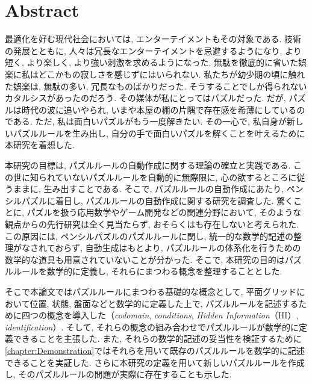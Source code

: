 \chapter*{{\rm \bf Abstract}}\label{chapter:Abstract}
最適化を好む現代社会においては, エンターテイメントもその対象である. 技術の発展とともに, 人々は冗長なエンターテイメントを忌避するようになり, より短く, より楽しく, より強い刺激を求めるようになった. 無駄を徹底的に省いた娯楽に私はどこかもの寂しさを感じずにはいられない. 私たちが幼少期の頃に触れた娯楽は, 無駄の多い, 冗長なものばかりだった. そうすることでしか得られないカタルシスがあったのだろう. その媒体が私にとってはパズルだった. だが, パズルは時代の波に追いやられ, いまや本屋の棚の片隅で存在感を希薄にしているのである. ただ, 私は面白いパズルがもう一度解きたい. その一心で, 私自身が新しいパズルルールを生み出し, 自分の手で面白いパズルを解くことを叶えるために本研究を着想した.


本研究の目標は, パズルルールの自動作成に関する理論の確立と実践である. この世に知られていないパズルルールを自動的に無際限に, 心の欲するところに従うままに, 生み出すことである. そこで, パズルルールの自動作成にあたり, ペンシルパズルに着目し, パズルルールの自動作成に関する研究を調査した. 驚くことに, パズルを扱う応用数学やゲーム開発などの関連分野において, そのような観点からの先行研究は全く見当たらず, おそらくはも存在しないと考えられた. この原因には, ペンシルパズルのパズルルールに関し, 統一的な数学的記述の整理がなされておらず, 自動生成はもとより, パズルルールの体系化を行うための数学的な道具も用意されていないことが分かった. そこで, 本研究の目的はパズルルールを数学的に定義し, それらにまつわる概念を整理することとした.

そこで本論文ではパズルルールにまつわる基礎的な概念として, 平面グリッドにおいて位置, 状態, 盤面などと数学的に定義した上で, パズルルールを記述するために四つの概念を導入した（\textit{codomain}, \textit{conditions}, \textit{Hidden Information}（HI）, \textit{identification}）. そして, それらの概念の組み合わせでパズルルールが数学的に定義できることを主張した. また, それらの数学的記述の妥当性を検証するために\cref{chapter:Demonstration}ではそれらを用いて既存のパズルルールを数学的に記述できることを実証した. さらに本研究の定義を用いて新しいパズルルールを作成し, そのパズルルールの問題が実際に存在することも示した.

